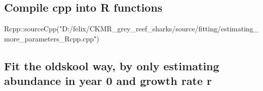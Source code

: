 \documentclass[
]{article}
\newenvironment{Shaded}{\begin{snugshade}}{\end{snugshade}}
\newcommand{\FunctionTok}[1]{\textcolor[rgb]{0.00,0.00,0.00}{#1}}
\newcommand{\NormalTok}[1]{#1}
\newcommand{\SpecialCharTok}[1]{\textcolor[rgb]{0.00,0.00,0.00}{#1}}
\newcommand{\StringTok}[1]{\textcolor[rgb]{0.31,0.60,0.02}{#1}}
\begin{document}
\hypertarget{compile-cpp-into-r-functions}{%
\subsection{Compile cpp into R
functions}\label{compile-cpp-into-r-functions}}

\begin{Shaded}
\begin{Highlighting}[]
\NormalTok{Rcpp}\SpecialCharTok{::}\FunctionTok{sourceCpp}\NormalTok{(}\StringTok{"D:/felix/CKMR\_grey\_reef\_sharks/source/fitting/estimating\_more\_parameters\_Rcpp.cpp"}\NormalTok{)}
\end{Highlighting}
\end{Shaded}

\hypertarget{fit-the-oldskool-way-by-only-estimating-abundance-in-year-0-and-growth-rate-r}{%
\subsection{Fit the oldskool way, by only estimating abundance in year 0
and growth rate
r}\label{fit-the-oldskool-way-by-only-estimating-abundance-in-year-0-and-growth-rate-r}}
\end{document}

